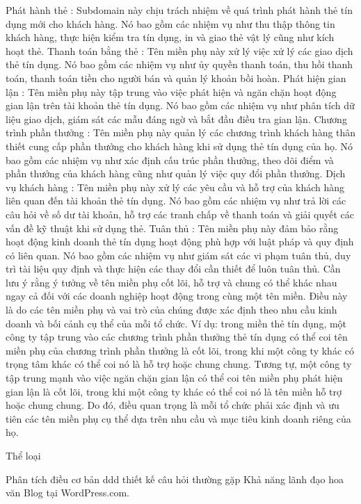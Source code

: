 Phát hành thẻ : Subdomain này chịu trách nhiệm về quá trình phát hành thẻ tín dụng mới cho khách hàng. Nó bao gồm các nhiệm vụ như thu thập thông tin khách hàng, thực hiện kiểm tra tín dụng, in và giao thẻ vật lý cũng như kích hoạt thẻ.
Thanh toán bằng thẻ : Tên miền phụ này xử lý việc xử lý các giao dịch thẻ tín dụng. Nó bao gồm các nhiệm vụ như ủy quyền thanh toán, thu hồi thanh toán, thanh toán tiền cho người bán và quản lý khoản bồi hoàn.
Phát hiện gian lận : Tên miền phụ này tập trung vào việc phát hiện và ngăn chặn hoạt động gian lận trên tài khoản thẻ tín dụng. Nó bao gồm các nhiệm vụ như phân tích dữ liệu giao dịch, giám sát các mẫu đáng ngờ và bắt đầu điều tra gian lận.
Chương trình phần thưởng : Tên miền phụ này quản lý các chương trình khách hàng thân thiết cung cấp phần thưởng cho khách hàng khi sử dụng thẻ tín dụng của họ. Nó bao gồm các nhiệm vụ như xác định cấu trúc phần thưởng, theo dõi điểm và phần thưởng của khách hàng cũng như quản lý việc quy đổi phần thưởng.
Dịch vụ khách hàng : Tên miền phụ này xử lý các yêu cầu và hỗ trợ của khách hàng liên quan đến tài khoản thẻ tín dụng. Nó bao gồm các nhiệm vụ như trả lời các câu hỏi về số dư tài khoản, hỗ trợ các tranh chấp về thanh toán và giải quyết các vấn đề kỹ thuật khi sử dụng thẻ.
Tuân thủ : Tên miền phụ này đảm bảo rằng hoạt động kinh doanh thẻ tín dụng hoạt động phù hợp với luật pháp và quy định có liên quan. Nó bao gồm các nhiệm vụ như giám sát các vi phạm tuân thủ, duy trì tài liệu quy định và thực hiện các thay đổi cần thiết để luôn tuân thủ.
Cần lưu ý rằng ý tưởng về tên miền phụ cốt lõi, hỗ trợ và chung có thể khác nhau ngay cả đối với các doanh nghiệp hoạt động trong cùng một tên miền. Điều này là do các tên miền phụ và vai trò của chúng được xác định theo nhu cầu kinh doanh và bối cảnh cụ thể của mỗi tổ chức. Ví dụ: trong miền thẻ tín dụng, một công ty tập trung vào các chương trình phần thưởng thẻ tín dụng có thể coi tên miền phụ của chương trình phần thưởng là cốt lõi, trong khi một công ty khác có trọng tâm khác có thể coi nó là hỗ trợ hoặc chung chung. Tương tự, một công ty tập trung mạnh vào việc ngăn chặn gian lận có thể coi tên miền phụ phát hiện gian lận là cốt lõi, trong khi một công ty khác có thể coi nó là tên miền hỗ trợ hoặc chung chung. Do đó, điều quan trọng là mỗi tổ chức phải xác định và ưu tiên các tên miền phụ cụ thể dựa trên nhu cầu và mục tiêu kinh doanh riêng của họ.


Thể loại

Phân tích
điều cơ bản
ddd
thiết kế
câu hỏi thường gặp
Khả năng lãnh đạo
hoa văn
Blog tại WordPress.com.

